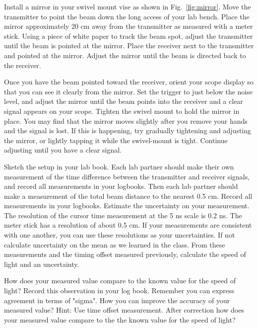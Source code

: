 Install a mirror in your swivel mount vise as shown in
Fig.~\ref{fig:mirror}. Move the transmitter to point the beam down the
long access of your lab bench.  Place the mirror approximately 20 cm
away from the transmitter as measured with a meter stick.  Using a
piece of white paper to track the beam spot, adjust the transmitter
until the beam is pointed at the mirror.  Place the receiver next to
the transmitter and pointed at the mirror.  Adjust the mirror until
the beam is directed back to the receiver. 

Once you have the beam pointed toward the receiver, orient your scope
display so that you can see it clearly from the mirror.  Set the
trigger to just below the noise level, and adjust the mirror until the
beam points into the receiver and a clear signal appears on your
scope.  Tighten the swivel mount to hold the mirror in place.  You may
find that the mirror moves slightly after you remove your hands and
the signal is lost.  If this is happening, try gradually tightening
and adjusting the mirror, or lightly tapping it while the swivel-mount
is tight.  Continue adjusting until you have a clear signal.  

\begin{measurement} Sketch the setup in your lab book. 
Each lab partner should make their own measurement of
the time difference between the transmitter and receiver signals, and
record all measurements in your logbooks.  Then each lab partner
should make a measurement of the total beam distance to the nearest
0.5 cm.  Record all measurements in your logbooks.  Estimate the
uncertainty on your measurement.  The resolution of the cursor time
measurement at the 5 ns scale is 0.2 ns.  The meter stick has a
resolution of about 0.5 cm.  If your measurements are consistent with
one another, you can use these resolutions as your uncertainties. 
If not calculate uncertainty on the mean as we learned in the class. 
From these measurements and the timing offset measured previously,
calculate the speed of light and an uncertainty. \end{measurement} 

\begin{calculation} How does your measured value compare to the known value for the speed of light? Record this observation in your log book. Remember you can express agreement in terms of "sigma". How you can improve the accuracy of your measured value? Hint: Use time offset measurement.  After correction how does your measured value compare to the the known value for the speed of light? \end{calculation}


